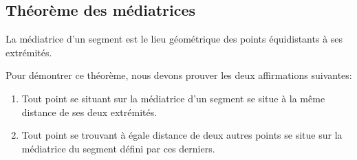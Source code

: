 \documentclass[a4paper,12pt]{article}
\begin{document}
\pagebreak
\subsection{Théorème des médiatrices}

\begin{theorem}
La médiatrice d'un segment est le lieu géométrique des points équidistants à ses extrémités.
\end{theorem}


Pour démontrer ce théorème, nous devons prouver les deux affirmations suivantes:
\begin{enumerate}
    \item Tout point se situant sur la médiatrice d'un segment se situe à la même distance de ses deux extrémités.
    \item Tout point se trouvant à égale distance de deux autres points se situe sur la médiatrice du segment défini par ces derniers.\\
\end{enumerate}
\end{document}
